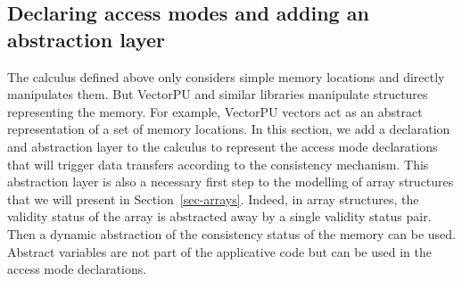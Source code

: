 \documentclass[preprint,12pt]{elsarticle}
\newcommand{\symb}[1]{\textit{#1}}
\newcommand{\Push}{\symb{Push}}
\newcommand{\Pull}{\symb{Pull}}
\newcommand{\isvalid}{\symb{isValid}}
\newtheorem{Theorem}{Theorem}
\begin{document}
%
%
%


\subsection{Declaring access modes and adding an abstraction layer}
The calculus defined above only considers simple memory locations and directly manipulates 
them.
But VectorPU and  similar libraries manipulate structures 
representing the memory. For example, VectorPU vectors act as an
 abstract representation of a set of memory 
locations. In this section, we add a declaration and abstraction layer to the calculus to 
represent the access mode declarations that will trigger data transfers according to the 
consistency mechanism. 
This abstraction layer is also a necessary first step to the modelling of array 
structures that we will present in Section~\ref{sec-arrays}. Indeed, in array structures, 
the 
validity status of the array is abstracted away by a single validity status pair. Then 
a dynamic abstraction of the consistency status of the memory can be used.
Abstract variables are not part of the applicative code but can be used in the access mode declarations. 
\end{document}
